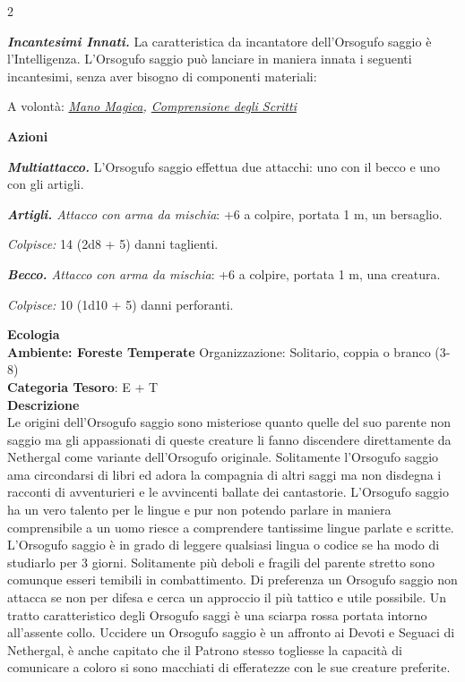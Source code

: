 \begin{multicols}{2}
{\emph{\textbf{Incantesimi Innati.}} La caratteristica da incantatore dell'Orsogufo saggio è l'Intelligenza. L'Orsogufo saggio può lanciare in maniera innata i seguenti incantesimi, senza aver bisogno di componenti materiali:

A volontà: \emph{\hyperlink{Mano Magica}{Mano Magica}, \hyperlink{Comprensione degli Scritti}{Comprensione degli Scritti}}

\textbf{Azioni}

\emph{\textbf{Multiattacco.}} L'Orsogufo saggio effettua due attacchi: uno con il becco e uno con gli artigli.

\emph{\textbf{Artigli.} Attacco con arma da mischia}: +6 a colpire, portata 1 m, un bersaglio.

\emph{Colpisce:} 14 (2d8 + 5) danni taglienti.

\emph{\textbf{Becco.} Attacco con arma da mischia}: +6 a colpire, portata 1 m, una creatura.

\emph{Colpisce:} 10 (1d10 + 5) danni perforanti.

\textbf{Ecologia}\\
\textbf{Ambiente: Foreste Temperate}
Organizzazione: Solitario, coppia o branco (3-8)\\
\textbf{Categoria Tesoro}: E + T\\
\textbf{Descrizione}\\
Le origini dell'Orsogufo saggio sono misteriose quanto quelle del suo parente non saggio ma gli appassionati di queste creature li fanno discendere direttamente da Nethergal come variante dell'Orsogufo originale.
Solitamente l'Orsogufo saggio ama circondarsi di libri ed adora la compagnia di altri saggi ma non disdegna i racconti di avventurieri e le avvincenti ballate dei cantastorie. L'Orsogufo saggio ha un vero talento per le lingue e pur non potendo parlare in maniera comprensibile a un uomo riesce a comprendere tantissime lingue parlate e scritte. L'Orsogufo saggio è in grado di leggere qualsiasi lingua o codice se ha modo di studiarlo per 3 giorni.
Solitamente più deboli e fragili del parente stretto sono comunque esseri temibili in combattimento.
Di preferenza un Orsogufo saggio non attacca se non per difesa e cerca un approccio il più tattico e utile possibile. Un tratto caratteristico degli Orsogufo saggi è una sciarpa rossa portata intorno all'assente collo. Uccidere un Orsogufo saggio è un affronto ai Devoti e Seguaci di Nethergal, è anche capitato che il Patrono stesso togliesse la capacità di comunicare a coloro si sono macchiati di efferatezze con le sue creature preferite.

}
\end{multicols}
